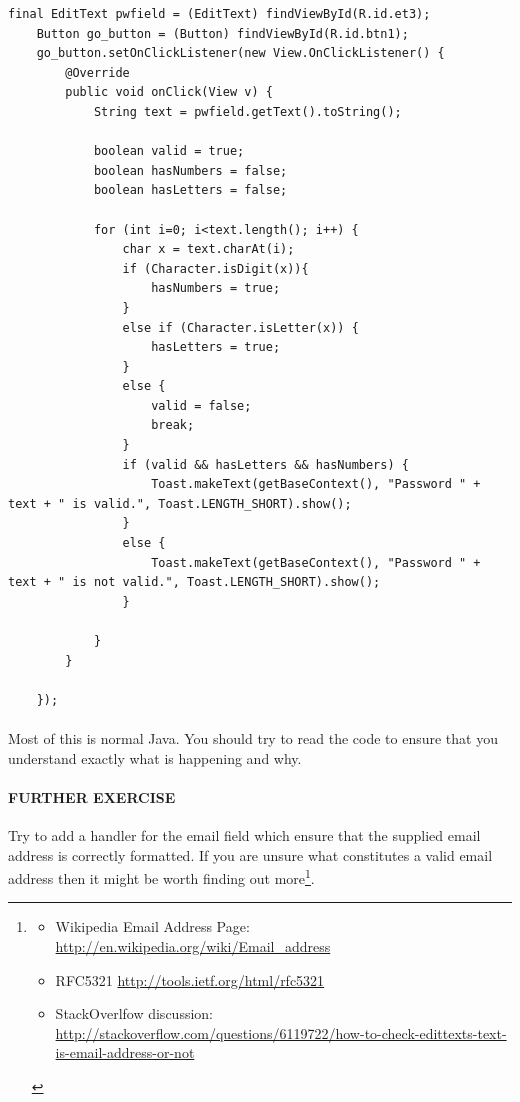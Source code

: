 \documentclass[12pt, a4paper, twoside]{book}
\begin{document}
\begin{lstlisting}
final EditText pwfield = (EditText) findViewById(R.id.et3);
    Button go_button = (Button) findViewById(R.id.btn1);
    go_button.setOnClickListener(new View.OnClickListener() {
        @Override
        public void onClick(View v) {
            String text = pwfield.getText().toString();

            boolean valid = true;
            boolean hasNumbers = false;
            boolean hasLetters = false;

            for (int i=0; i<text.length(); i++) {
                char x = text.charAt(i);
                if (Character.isDigit(x)){
                    hasNumbers = true;
                }
                else if (Character.isLetter(x)) {
                    hasLetters = true;
                }
                else {
                    valid = false;
                    break;
                }
                if (valid && hasLetters && hasNumbers) {
                    Toast.makeText(getBaseContext(), "Password " + text + " is valid.", Toast.LENGTH_SHORT).show();
                }
                else {
                    Toast.makeText(getBaseContext(), "Password " + text + " is not valid.", Toast.LENGTH_SHORT).show();
                }

            }
        }

    });
\end{lstlisting}

\paragraph{} Most of this is normal Java. You should try to read the code to ensure that you understand exactly what is happening and why.

\paragraph{FURTHER EXERCISE} Try to add a handler for the email field which ensure that the supplied email address is correctly formatted. If you are unsure what constitutes a valid email address then it might be worth finding out more\footnote{\begin{itemize}\item Wikipedia Email Address Page: \url{http://en.wikipedia.org/wiki/Email_address} \item RFC5321 \url{http://tools.ietf.org/html/rfc5321} \item StackOverlfow discussion: \url{http://stackoverflow.com/questions/6119722/how-to-check-edittexts-text-is-email-address-or-not}\end{itemize}}.
\end{document}
